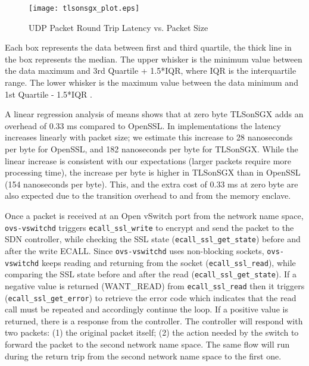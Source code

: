 {\begin{figure*}[t!]
\centering
\texttt{[image: tlsonsgx\_plot.eps]}
\caption{UDP Packet Round Trip Latency vs. Packet Size}
\label{fig:tcp_latency}
\end{figure*}

Each box represents the data between first and third quartile, the thick line in the box represents the median.
The upper whisker is the minimum value between the data maximum and 3rd Quartile + 1.5*IQR, where IQR is the interquartile range.
The lower whisker is the maximum value between the data minimum and 1st Quartile - 1.5*IQR \cite{frigge:1989}.

A linear regression analysis of means shows that at zero byte TLSonSGX adds an overhead of 0.33 ms compared to OpenSSL.
In implementations the latency increases linearly with packet size;
we estimate this increase to 28 nanoseconds per byte for OpenSSL, and 182 nanoseconds per byte for TLSonSGX.
While the linear increase is consistent with our expectations (larger packets require more processing time),
the increase per byte is higher in TLSonSGX than in OpenSSL (154 nanoseconds per byte).
This, and the extra cost of 0.33 ms at zero byte are also expected due to the transition overhead to and from the memory enclave.

Once a packet is received at an Open vSwitch port from the network name space, \texttt{ovs-vswitchd} triggers \texttt{ecall\_ssl\_write} to encrypt and send the packet to the SDN controller,  while checking the SSL state (\texttt{ecall\_ssl\_get\_state}) before and after the write ECALL.
Since \texttt{ovs-vswitchd} uses non-blocking sockets, \texttt{ovs-vswitchd} keeps reading and returning from the socket (\texttt{ecall\_ssl\_read}), while comparing the SSL state before and after the read \newline (\texttt{ecall\_ssl\_get\_state}).
If a negative value is returned (WANT\_READ) from \texttt{ecall\_ssl\_read} then it triggers (\texttt{ecall\_ssl\_get\_error}) to retrieve the error code which indicates that the read call must be repeated and accordingly continue the loop.
If a positive value is returned, there is a response from the controller. 
The controller will respond with two packets: (1) the original packet itself; (2) the action needed by the switch to forward the packet to the second network name space.
The same flow will run during the return trip from the second network name space to the first one.


}
